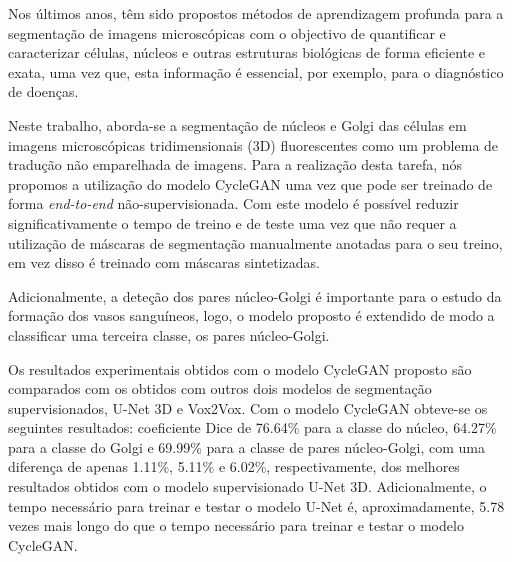 \acresetall
\noindent Nos últimos anos, têm sido propostos métodos de aprendizagem profunda para a segmentação de imagens microscópicas com o objectivo de quantificar e caracterizar células, núcleos e outras estruturas biológicas de forma eficiente e exata, uma vez que, esta informação é essencial, por exemplo, para o diagnóstico de doenças.

Neste trabalho, aborda-se a segmentação de núcleos e Golgi das células em imagens microscópicas tridimensionais (3D) fluorescentes como um problema de tradução não emparelhada de imagens. Para a realização desta tarefa, nós propomos a utilização do modelo CycleGAN uma vez que pode ser treinado de forma \textit{end-to-end} não-supervisionada. Com este modelo é possível reduzir significativamente o tempo de treino e de teste uma vez que não requer a utilização de máscaras de segmentação manualmente anotadas para o seu treino, em vez disso é treinado com máscaras sintetizadas.

Adicionalmente, a deteção dos pares núcleo-Golgi é importante para o estudo da formação dos vasos sanguíneos, logo, o modelo proposto é extendido de modo a classificar uma terceira classe, os pares núcleo-Golgi.

Os resultados experimentais obtidos com o modelo CycleGAN proposto são comparados com os obtidos com outros dois modelos de segmentação supervisionados, U-Net 3D e Vox2Vox. Com o modelo CycleGAN obteve-se os seguintes resultados: coeficiente Dice de 76.64\% para a classe do núcleo, 64.27\% para a classe do Golgi e 69.99\% para a classe de pares núcleo-Golgi, com uma diferença de apenas 1.11\%, 5.11\% e 6.02\%, respectivamente, dos melhores resultados obtidos com o modelo supervisionado U-Net 3D. Adicionalmente, o tempo necessário para treinar e testar o modelo U-Net é, aproximadamente, 5.78 vezes mais longo do que o tempo necessário para treinar e testar o modelo CycleGAN.




